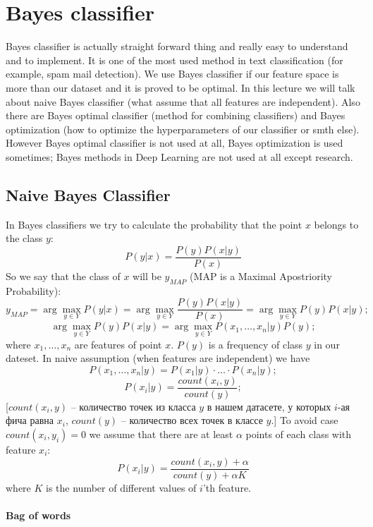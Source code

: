 \chapter{Bayes classifier}

{\sf Bayes classifier is actually straight forward thing and really easy to understand and to implement. It is one of the most used method in text classification (for example, spam mail detection). We use Bayes classifier if our feature space is more than our dataset and it is proved to be optimal. In this lecture we will talk about naive Bayes classifier (what assume that all features are independent). Also there are Bayes optimal classifier (method for combining classifiers) and Bayes optimization (how to optimize the hyperparameters of our classifier or smth else). However Bayes optimal classifier is not used at all, Bayes optimization is used sometimes; Bayes methods in Deep Learning are not used at all except research.}

\section{Naive Bayes Classifier}

In Bayes classifiers we try to calculate the probability that the point $x$ belongs to the class $y$:
$$P(y|x)=\frac{P(y)P(x|y)}{P(x)}$$
So we say that the class of $x$ will be $y_{MAP}$ (MAP is a Maximal Apostriority Probability):
$$y_{MAP}=\arg\max\limits_{y\in Y} P(y|x)=\arg\max\limits_{y\in Y}\frac{P(y)P(x|y)}{P(x)}=\arg\max\limits_{y\in Y} P(y)P(x|y);$$
$$\arg\max\limits_{y\in Y} P(y)P(x|y)=\arg\max\limits_{y\in Y} P(x_1,\ldots,x_n|y)P(y);$$
where $x_1,\ldots,x_n$ are features of point $x$. $P(y)$ is a frequency of class $y$ in our dateset. In naive assumption (when features are independent) we have
$$P(x_1,\ldots,x_n|y)=P(x_1|y)\cdot\ldots\cdot P(x_n|y);$$
$$P(x_i|y)=\frac{count(x_i,y)}{count(y)};$$
[$count(x_i, y)$ -- количество точек из класса $y$ в нашем датасете, у которых $i$-ая фича равна $x_i$, $count(y)$ -- количество всех точек в классе $y$.] To avoid case $count(x_i,y_i)=0$ we assume that there are at least $\alpha$ points of each class with feature $x_i$:
$$P (x_i|y)=\frac{count(x_i,y)+\alpha}{count(y)+\alpha K}$$
where $K$ is the number of different values of $i$'th feature.

\subsubsection*{Bag of words}


